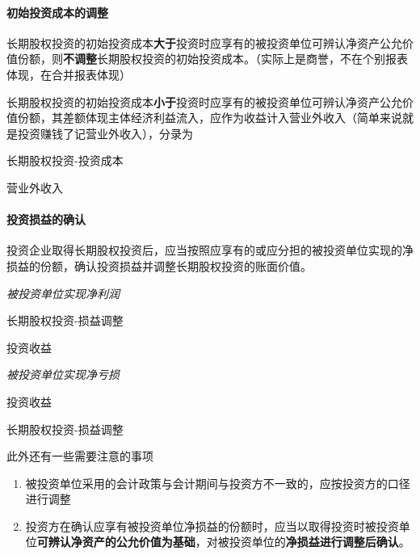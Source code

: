 \documentclass[UTF8,12pt]{ctexart}
\newenvironment{Dr}{%
	\begin{list}{}%
		{
			\setlength{\leftmargin}{2em}
			\setlength{\labelwidth}{2em}
			\setlength{\labelsep}{0pt}
			\setlength{\itemindent}{0pt}
			\setlength{\listparindent}{0pt}
			\setlength{\parsep}{0pt}
			\setlength{\topsep}{0pt}
		}
		\item[\textbf{借：}]
	}{%
	\end{list}
}
\newenvironment{Cr}{%
	\begin{list}{}%
		{
			\setlength{\leftmargin}{2em}
			\setlength{\labelwidth}{2em}
			\setlength{\labelsep}{0pt}
			\setlength{\itemindent}{0pt}
			\setlength{\listparindent}{0pt}
			\setlength{\parsep}{0pt}
			\setlength{\topsep}{0pt}
		}
		\item[\textbf{贷：}]
	}{%
	\end{list}
}
\numberwithin{equation}{section} %
\numberwithin{figure}{section}
\numberwithin{table}{section}
\begin{document}
	
	
	
	\paragraph{初始投资成本的调整}
	长期股权投资的初始投资成本\textbf{大于}投资时应享有的被投资单位可辨认净资产公允价值份额，则\textbf{不调整}长期股权投资的初始投资成本。（实际上是商誉，不在个别报表体现，在合并报表体现）
	
	长期股权投资的初始投资成本\textbf{小于}投资时应享有的被投资单位可辨认净资产公允价值份额，其差额体现主体经济利益流入，应作为收益计入营业外收入（简单来说就是投资赚钱了记营业外收入），分录为
	
	\begin{Dr}
		长期股权投资-投资成本
	\end{Dr}
	\begin{Cr}
		营业外收入
	\end{Cr}
	
	
	
	\paragraph{投资损益的确认}
	投资企业取得长期股权投资后，应当按照应享有的或应分担的被投资单位实现的净损益的份额，确认投资损益并调整长期股权投资的账面价值。
	
	\textit{被投资单位实现净利润}
	
	\begin{Dr}
		长期股权投资-损益调整
	\end{Dr}
	\begin{Cr}
		投资收益
	\end{Cr}
	
	\textit{被投资单位实现净亏损}
	
	\begin{Dr}
		投资收益
	\end{Dr}
	\begin{Cr}
		长期股权投资-损益调整
	\end{Cr}
	
	此外还有一些需要注意的事项
	\begin{enumerate}
		\item 被投资单位采用的会计政策与会计期间与投资方不一致的，应按投资方的口径进行调整
		
		\item 投资方在确认应享有被投资单位净损益的份额时，应当以取得投资时被投资单位\textbf{可辨认净资产的公允价值为基础}，对被投资单位的\textbf{净损益进行调整后确认}。
	\end{enumerate}
	
\end{document}

